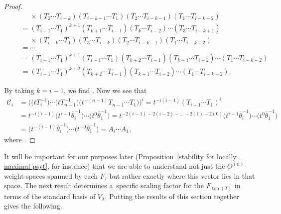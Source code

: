 \documentclass[pdftex]{sigma}
\numberwithin{equation}{section}
\theoremstyle{definition}
\DeclareMathOperator{\Top}{\mathrm{top}}
\begin{document}
\begin{proof}
\begin{gather*}
 \phantom{ \qquad = }{} \times (T_2\cdots T_{i-k})(T_{i-k-1}\cdots T_{1})(T_{2}\cdots T_{i-k-1})(T_1 \cdots T_{i-k-2}) \\
 \qquad = (T_{i-1}\cdots T_1)^{k+1} (T_{k+1}\cdots T_{i-1})(T_k\cdots T_{i-2})\cdots (T_3\cdots T_{i-k+1}) \\
 \phantom{ \qquad = }{} \times (T_{i-k}\cdots T_{1})(T_{3}\cdots T_{i-k})(T_{2}\cdots T_{i-k-1})(T_1 \cdots T_{i-k-2}) \\
 \qquad = \cdots \\
 \qquad = (T_{i-1}\cdots T_1)^{k+1} (T_{i-1}\cdots T_1)(T_{k+2}\cdots T_{i-1})(T_{k+1}\cdots T_{i-2})\cdots (T_1\cdots T_{i-k-2}) \\
 \qquad = (T_{i-1}\cdots T_1)^{k+2}(T_{k+2}\cdots T_{i-1})(T_{k+1}\cdots T_{i-2})\cdots (T_1\cdots T_{i-k-2}).
 \end{gather*}

 By taking $k = i-1$, we find
.
 Now we see that
 \begin{align*}
 \mathscr{C}_i& = \bigl( \bigl(tT_i^{-1}\bigr)\cdots \bigl(tT_{n-1}^{-1}\bigr) \bigl(t^{-(n-1)}T_{n-1}\cdots T_1\bigr) \bigr)^{i}
 = t^{-i(i-1)} (T_{i-1}\cdots T_1)^{i} \\
 & = t^{-i(i-1)} \bigl(t^{i-1}\overline{\theta}_{i}^{-1}\bigr)\cdots \bigl(t^{0}\overline{\theta}_{1}^{-1}\bigr)
 = t^{-2(i-1)-2(i-2)-\dots -2(1)-2(0)} \bigl(t^{i-1}\overline{\theta}_{i}^{-1}\bigr)\cdots \bigl(t^{0}\overline{\theta}_{1}^{-1}\bigr) \\
 & = \bigl(t^{-(i-1)}\overline{\theta}_{i}^{-1}\bigr)\cdots \bigl(t^{-0}\overline{\theta}_{1}^{-1}\bigr)
 = A_{i}\cdots A_1 ,
 \end{align*}
 where .
\end{proof}

It will be important for our purposes later (Proposition~\ref{stability for locally maximal psyt}, for instance) that we are able to understand not just the $\Theta^{(n)}$-weight spaces spanned by each $F_{\tau}$ but rather exactly where this vector lies in that space. The next result determines a~specific scaling factor for the $F_{\Top(T)}$ in terms of the standard basis of $V_{\lambda}$. Putting the results of this section together gives the following.
\end{document}
